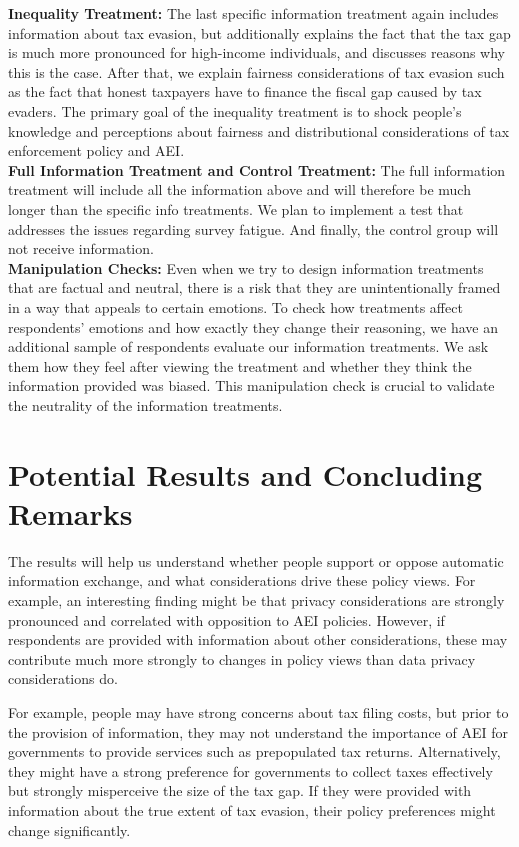 \documentclass[11pt]{article}
\begin{document}
\textbf{Inequality Treatment:}
The last specific information treatment again includes information about tax evasion, but additionally explains the fact that the tax gap is much more pronounced for high-income individuals, and discusses reasons why this is the case. After that, we explain fairness considerations of tax evasion such as the fact that honest taxpayers have to finance the fiscal gap caused by tax evaders. The primary goal of the inequality treatment is to shock people’s knowledge and perceptions about fairness and distributional considerations of tax enforcement policy and AEI. \\[0.5em]
\textbf{Full Information Treatment and Control Treatment:} The full information treatment will include all the information above and will therefore be much longer than the specific info treatments. We plan to implement a test that addresses the issues regarding survey fatigue. And finally, the control group will not receive information.  \\[0.5em]
\textbf{Manipulation Checks:} Even when we try to design information treatments that are factual and neutral, there is a risk that they are unintentionally framed in a way that appeals to certain emotions. To check how treatments affect respondents' emotions and how exactly they change their reasoning, we have an additional sample of respondents evaluate our information treatments. We ask them how they feel after viewing the treatment and whether they think the information provided was biased. This manipulation check is crucial to validate the neutrality of the information treatments.

\section{Potential Results and Concluding Remarks}
The results will help us understand whether people support or oppose automatic information exchange, and what considerations drive these policy views. For example, an interesting finding might be that privacy considerations are strongly pronounced and correlated with opposition to AEI policies. However, if respondents are provided with information about other considerations, these may contribute much more strongly to changes in policy views than data privacy considerations do. 

For example, people may have strong concerns about tax filing costs, but prior to the provision of information, they may not understand the importance of AEI for governments to provide services such as prepopulated tax returns. Alternatively, they might have a strong preference for governments to collect taxes effectively but strongly misperceive the size of the tax gap. If they were provided with information about the true extent of tax evasion, their policy preferences might change significantly. 
\end{document}
